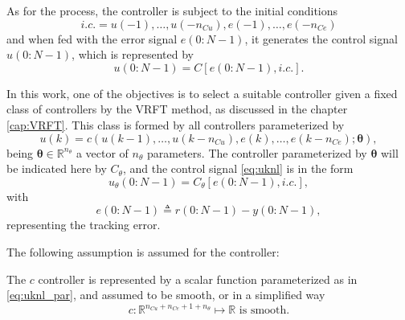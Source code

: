 As for the process, the controller is subject to the initial conditions $$i.c.= u(-1), \ldots, u(-n_{C u}), e(-1), \ldots, e(-n_{C e})$$
and when fed with the error signal $e(0{:}N-1)$, it generates the control signal $u(0{:}N-1)$, which is represented by
\begin{equation}
   u(0{:}N-1)=C[e(0{:}N-1), i.c.].
\label{eq:Cnl}
\end{equation}

In this work, one of the objectives is to select a suitable controller given a fixed class of controllers by the VRFT method, as discussed in the chapter \ref{cap:VRFT}. This class is formed by all controllers parameterized by
\begin{equation}
   u(k)=c\left(u(k-1), \ldots, u(k-n_{C u}), e(k), \ldots, e(k-n_{C e}); \bm{\theta}\right),
\label{eq:uknl_par}
\end{equation}
being $\bm{\theta} \in \mathbb{R}^{n_\theta}$ a vector of $n_{\theta}$ parameters. The controller parameterized by $\bm{\theta}$ will be indicated here by $C_{\theta}$, and the control signal \eqref{eq:uknl} is in the form
\begin{equation}
   u_{\theta}(0{:}N-1)=C_{\theta}[e(0{:}N-1), i.c.],
\label{eq:utheta}
\end{equation}
with
\begin{equation}
   e(0{:} N-1)\triangleq r(0{:} N-1)-y(0{:} N-1),
\label{eq:erro}
\end{equation}
representing the tracking error.

The following assumption is assumed for the controller:
\begin{assum}
   The $c$ controller is represented by a scalar function parameterized as in \eqref{eq:uknl_par}, and assumed to be smooth, or in a simplified way
   \begin{equation}
      c:\mathbb{R}^{n_{Cu}+n_{Ce}+1+n_{\theta}} \mapsto \mathbb{R} \text{ is smooth}.
      \label{eq:assumcon}
   \end{equation}
\end{assum}



